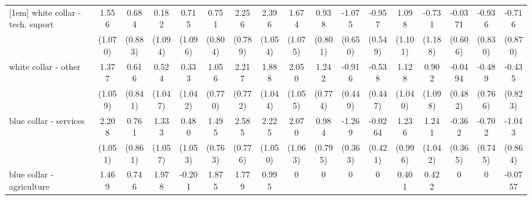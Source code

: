 {\begin{tabular}{l*{16}{c}}
[1em]
white collar - tech. suport&       1.556         &       0.684         &       0.182         &       0.715         &       0.751         &       2.256\sym{**} &       2.396\sym{*}  &       1.674         &       0.938         &      -1.075         &      -0.957         &       1.098         &      -0.731         &     -0.0371         &      -0.936         &      -0.716         \\
                    &     (1.070)         &     (0.883)         &     (1.094)         &     (1.096)         &     (0.804)         &     (0.789)         &     (1.054)         &     (1.075)         &     (0.801)         &     (0.650)         &     (0.549)         &     (1.101)         &     (1.188)         &     (0.606)         &     (0.830)         &     (0.870)         \\
[1em]
white collar - other&       1.377         &       0.616         &       0.524         &       0.333         &       1.056         &       2.217\sym{**} &       1.888         &       2.050         &       1.242         &      -0.916\sym{*}  &      -0.538         &       1.128         &       0.902         &     -0.0494         &      -0.489         &      -0.435         \\
                    &     (1.059)         &     (0.841)         &     (1.047)         &     (1.042)         &     (0.770)         &     (0.772)         &     (1.044)         &     (1.055)         &     (0.774)         &     (0.449)         &     (0.447)         &     (1.040)         &     (1.098)         &     (0.482)         &     (0.766)         &     (0.823)         \\
[1em]
blue collar - services&       2.208\sym{*}  &       0.761         &       1.333         &       0.480         &       1.495         &       2.585\sym{***}&       2.225\sym{*}  &       2.070         &       0.984         &      -1.269\sym{***}&     -0.0264         &       1.236         &       1.241         &      -0.362         &      -0.702         &      -1.043         \\
                    &     (1.051)         &     (0.861)         &     (1.057)         &     (1.053)         &     (0.763)         &     (0.776)         &     (1.050)         &     (1.063)         &     (0.795)         &     (0.363)         &     (0.421)         &     (0.996)         &     (1.042)         &     (0.365)         &     (0.745)         &     (0.864)         \\
[1em]
blue collar - agriculture&       1.469         &       0.746         &       1.978         &      -0.201         &       1.875         &       1.779         &       0.995         &           0         &           0         &           0         &           0         &       0.401         &       0.422         &           0         &           0         &     -0.0757         \\

\end{tabular}}
